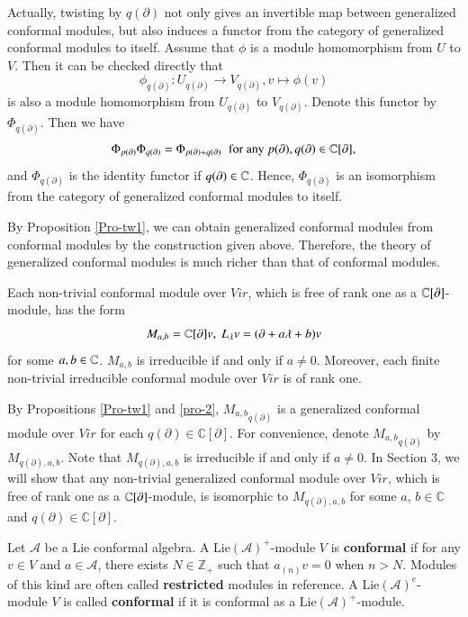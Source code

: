 \documentclass[12pt]{amsart}
\begin{document}
\begin{rmk}\label{Rmk-tw}
Actually, twisting by $q(\partial)$ not only gives an invertible map between generalized conformal modules, but also induces a functor from the category of generalized conformal modules to itself.
Assume that $\phi$ is a module homomorphism from $U$ to $V$. Then it can be checked directly that
$$\phi_{q(\partial)}: U_{q(\partial)}\rightarrow V_{q(\partial)}, v\mapsto \phi(v)$$ is also a module homomorphism from $U_{q(\partial)}$ to $V_{q(\partial)}$.
Denote this functor by $\Phi_{q(\partial)}$. Then we have $$\Phi_{p(\partial)}\Phi_{q(\partial)}=\Phi_{p(\partial)+q(\partial)}\;\;\text{for any $p(\partial), q(\partial)\in\mathbb{C}[\partial]$,}$$
and $\Phi_{q(\partial)}$ is the identity functor if $q(\partial)\in\mathbb{C}$.
Hence, $\Phi_{q(\partial)}$ is an isomorphism from the category of generalized conformal modules to itself.
\end{rmk}
\begin{rmk}
By Proposition \ref{Pro-tw1}, we can obtain generalized conformal modules from conformal modules by the construction given above. Therefore, the theory of generalized conformal modules is much richer than that of conformal modules.
\end{rmk}

\begin{pro}\label{pro-2}\cite{CK}
Each non-trivial conformal module over $Vir$, which is free of rank one as a $\mathbb{C}[\partial]$-module, has the form
$$M_{a,b}=\mathbb{C}[\partial]v, \ L_\lambda v=(\partial+a \lambda +b)v$$
for some $a,b\in\mathbb{C}$.  $M_{a,b}$ is irreducible if and only if $a\neq 0$. Moreover, each finite non-trivial irreducible conformal module over $Vir$ is of rank one.
\end{pro}

By Propositions \ref{Pro-tw1} and \ref{pro-2}, ${M_{a,b}}_{q(\partial)}$ is a generalized conformal module over $Vir$ for each $q(\partial)\in \mathbb{C}[\partial]$. For convenience, denote ${M_{a,b}}_{q(\partial)}$ by $M_{q(\partial),a,b}$. Note that $M_{q(\partial),a,b}$ is irreducible if and only if $a\neq 0$. In Section 3, we will show that any non-trivial generalized conformal module over $Vir$, which is free of rank one as a $\mathbb{C}[\partial]$-module, is isomorphic to $M_{q(\partial),a,b}$ for some $a$, $b\in \mathbb{C}$ and $q(\partial)\in \mathbb{C}[\partial]$.

\begin{defi}\cite{K1}
Let $\mathcal{A}$ be a Lie conformal algebra. A $\text{Lie}( \mathcal{A})^+$-module $V$ is {\bf conformal} if for any $v \in V$ and $ a \in \mathcal{A}$, there exists $N \in \mathbb{Z}_+$ such that $a_{(n)}v=0$ when $n>N$. Modules of this kind are often called {\bf restricted} modules in reference.
A $\text{Lie}( \mathcal{A})^e$-module $V$ is called {\bf conformal} if it is conformal as a $\text{Lie}( \mathcal{A})^+$-module.
\end{defi}
\end{document}
